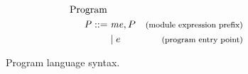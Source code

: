 \begin{figure}[!htb]
\captionsetup{skip=0pt}
\begin{align*}
\begin{aligned}
\text{Program } \\
\mathit{P} ::= \; & \mathit{me}, P & \footnotesize\text{(module expression prefix)}\\
&|\; e & \footnotesize\text{(program entry point)}\\
\end{aligned}
\end{align*}
\caption[Syntax: Program Language]{Program language syntax. \label{fig:ProgramSyntax}}
\end{figure}
